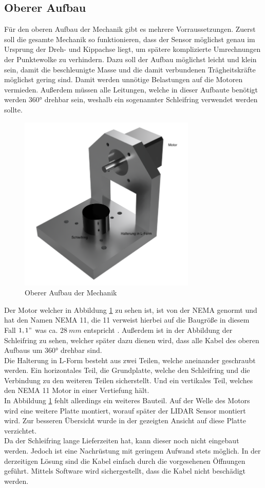 \subsection{Oberer Aufbau}
Für den oberen Aufbau der Mechanik gibt es mehrere Vorraussetzungen. Zuerst soll die gesamte Mechanik so funktionieren, dass der Sensor möglichst genau im Ursprung der Dreh- und Kippachse liegt, um spätere komplizierte Umrechnungen der Punktewolke zu verhindern. Dazu soll der Aufbau möglichst leicht und klein sein, damit die beschleunigte Masse und die damit verbundenen Trägheitskräfte möglichst gering sind. Damit werden unnötige Belastungen auf die Motoren vermieden. Außerdem müssen alle Leitungen, welche in dieser Aufbaute benötigt werden 360° drehbar sein, weshalb ein sogenannter Schleifring verwendet werden sollte. 
\begin{figure}[H]
	\centering
	\includegraphics[width=0.75\textwidth]{images/Mechanik/ObererAufbau}
	\caption{Oberer Aufbau der Mechanik}
	\label{obereraufbau}
\end{figure}
Der Motor welcher in Abbildung \ref{obereraufbau} zu sehen ist, ist von der \ac{NEMA} genormt und hat den Namen \ac{NEMA} 11, die 11 verweist hierbei auf die Baugröße in diesem Fall $1,1"$ was ca. $28\:mm$ entspricht \cite{NEMA}. Außerdem ist in der Abbildung der Schleifring zu sehen, welcher später dazu dienen wird, dass alle Kabel des oberen Aufbaus um 360° drehbar sind. \\
Die Halterung in L-Form besteht aus zwei Teilen, welche aneinander geschraubt werden. Ein horizontales Teil, die Grundplatte, welche den Schleifring und die Verbindung zu den weiteren Teilen sicherstellt. Und ein vertikales Teil, welches den \ac{NEMA} 11 Motor in einer Vertiefung hält.\\
In Abbildung \ref{obereraufbau} fehlt allerdings ein weiteres Bauteil. Auf der Welle des Motors wird eine weitere Platte montiert, worauf später der \ac{LIDAR} Sensor montiert wird. Zur besseren Übersicht wurde in der gezeigten Ansicht auf diese Platte verzichtet.\\
Da der Schleifring lange Lieferzeiten hat, kann dieser noch nicht eingebaut werden. Jedoch ist eine Nachrüstung mit geringem Aufwand stets möglich. In der derzeitigen Lösung sind die Kabel einfach durch die vorgesehenen Öffnungen geführt. Mittels Software wird sichergestellt, dass die Kabel nicht beschädigt werden. 
